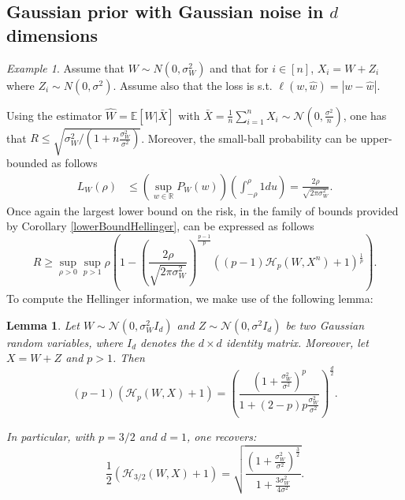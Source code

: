 \documentclass[conference]{IEEEtran}
\theoremstyle{plain}
\newtheorem{lemma}{Lemma}
\theoremstyle{definition}
\theoremstyle{remark}
\newtheorem{example}{Example}
\begin{document}
\subsection{Gaussian prior with Gaussian noise in $d$ dimensions}
\begin{example}\label{gaussianPriorGaussianNoise}
Assume that $W\sim N(0,\sigma^2_W)$ and that for $i\in[n]$, $X_i = W + Z_i$ where $Z_i \sim N(0,\sigma^2)$. Assume also that the loss is s.t. $\ell(w,\hat{w}) = |w-\hat{w}|$.
\end{example}
Using the estimator $\hat{W} = \mathbb{E}[W|\bar{X}]$ with $\bar{X} = \frac{1}{n}\sum_{i=1}^n X_i \sim \mathcal{N}(0, \frac{\sigma^2}{n})$, one has that $R \leq \sqrt{\sigma_W^2/\left(1+n\frac{\sigma_W^2}{\sigma^2}\right)}$. Moreover, the small-ball probability can be upper-bounded as follows
\begin{align}
    L_W(\rho) %
   &\leq %
   \left(\sup_{w\in\mathbb{R}} P_W(w)\right)\left(\int_{-\rho}^{\rho} 1du\right)=\frac{2\rho}{\sqrt{2\pi \sigma_W^2}}.
\end{align}
Once again the largest lower bound on the risk, in the family of bounds provided by Corollary \ref{lowerBoundHellinger}, can be expressed as follows
\begin{equation}
    R\!\geq\!\sup_{\rho > 0} \sup_{p > 1}\rho\!\left(\!\!1- \left(\!\!\frac{2\rho}{\sqrt{2\pi\sigma_W^2}}\!\!\right)^{\frac{p-1}{p}}\!\!\!\!\left(\!(p-1)\mathcal{H}_p(W,X^n) \!+\!1\!\right)\!^\frac{1}{p}\!\!\right). \label{equation:gaussian_lower_bound}
\end{equation}
To compute the Hellinger information, we make use of the following lemma:
\begin{lemma}\label{lemma:hellinger_gaussian}
Let $W \sim \mathcal{N}(0, \sigma_W^2I_d)$ and $Z\sim \mathcal{N}(0, \sigma^2I_d)$ be two Gaussian random variables, where $I_d$ denotes the $d\times d$ identity matrix. Moreover, let $X = W+Z$ and $p>1$. Then 
\begin{equation}
    (p-1)(\mathcal{H}_p(W,X)+1) = \left(\frac{\left(1+\frac{\sigma_W^2}{\sigma^2}\right)^p}{1 + (2-p)p\frac{\sigma_W^2}{\sigma^2}}\right)^\frac{d}{2}.
\end{equation}

In particular, with $p=3/2$ and $d=1$, one recovers:
\begin{equation}\label{equation:hellinger_gaussian_32}
    \frac{1}{2}(\mathcal{H}_{3/2}(W, X)+1) =  \sqrt{\frac{\left(1+\frac{\sigma_W^2}{\sigma^2}\right)^\frac32}{1 + \frac{3\sigma_W^2}{4\sigma^2}}}.
\end{equation}
\end{lemma}
\end{document}
